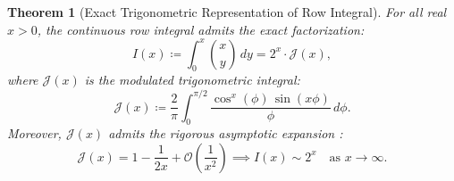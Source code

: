 \documentclass[11pt,a4paper]{article}
\theoremstyle{plain}
\newtheorem{theorem}{Theorem}[section]
\theoremstyle{definition}
\theoremstyle{remark}
\numberwithin{equation}{section}
\begin{document}
\begin{theorem}[Exact Trigonometric Representation of Row Integral]
\label{thm:2d_row_integral}
For all real $x > 0$, the continuous row integral admits the exact factorization:
\begin{equation}
I(x) \coloneqq \int_0^x \binom{x}{y}\,dy = 2^x \cdot \mathcal{J}(x),
\end{equation}
where $\mathcal{J}(x)$ is the modulated trigonometric integral:
\begin{equation}
\mathcal{J}(x) \coloneqq \frac{2}{\pi}\int_0^{\pi/2} \frac{\cos^x(\phi)\,\sin(x\phi)}{\phi}\,d\phi.
\end{equation}
Moreover, $\mathcal{J}(x)$ admits the rigorous asymptotic expansion \cite{wong2001}:
\begin{equation}
\mathcal{J}(x) = 1 - \frac{1}{2x} + \mathcal{O}\left(\frac{1}{x^2}\right) \implies I(x) \sim 2^x \quad \text{as } x \to \infty.
\end{equation}
\end{theorem}
\end{document}
